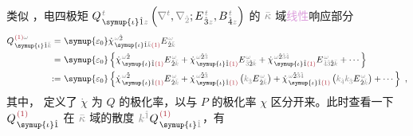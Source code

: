 类似 ，电四极矩 $Q^{\;\!\mathcolor{gray}{t}}_{\;\! \symup{\iota} \hat{1} \mathcolor{gray}{z}} \left( \mathcolor{gray}{\nabla^t}, \mathcolor{gray}{\nabla_{\hat{2}}} ; E^{\;\!\mathcolor{gray}{t}}_{\;\! \hat{3}\mathcolor{gray}{z}}, B^{\;\!\mathcolor{gray}{t}}_{\;\! \hat{4}\mathcolor{gray}{z}} \right)$ 的 $\mathcolor{gray}{\bar{\kappa}}$ 域\textcolor{Plum}{线性}响应部分
\begin{subequations}
\begin{align}
	Q^{\;\! \textcolor{Maroon}{(1)} \mathcolor{gray}{\omega}}_{\;\! \symup{\iota} \hat{1} \mathcolor{gray}{\bar{k}}} =&~ {\symup{\varepsilon_0}} \dot{\chi}^{\;\! \mathcolor{gray}{\omega} \hat{2}}_{\;\! \symup{\iota} \hat{1} \mathcolor{gray}{\bar{k}} \textcolor{Maroon}{(1)}} E^{\;\!\mathcolor{gray}{\omega}}_{\;\! \hat{2} \mathcolor{gray}{\bar{k}}} \\ =&~ {\symup{\varepsilon_0}} \left\{ \dot{\chi}^{\;\! \mathcolor{gray}{\omega} \hat{2}}_{\;\! \symup{\iota} \hat{1} \textcolor{Maroon}{(1)}} E^{\;\!\mathcolor{gray}{\omega}}_{\;\! \hat{2} \mathcolor{gray}{\bar{k}}} + \dot{\chi}^{\;\! \mathcolor{gray}{\omega} \hat{2} \mathcolor{gray}{\hat{3}}}_{\;\! \symup{\iota} \hat{1} \textcolor{Maroon}{(1)}} E^{\;\!\mathcolor{gray}{\omega}}_{\;\! \mathcolor{gray}{\hat{3}} \hat{2} \mathcolor{gray}{\bar{k}}} + \dot{\chi}^{\;\! \mathcolor{gray}{\omega} \hat{2} \mathcolor{gray}{\hat{3} \hat{4}}}_{\;\! \symup{\iota} \hat{1} \textcolor{Maroon}{(1)}} E^{\;\!\mathcolor{gray}{\omega}}_{\;\! \mathcolor{gray}{\hat{4} \hat{3}} \hat{2} \mathcolor{gray}{\bar{k}}} + \cdots \right\}  \label{eq:Q(1)_wk} \\ :=&~ {\symup{\varepsilon_0}} \left\{ \dot{\chi}^{\;\! \mathcolor{gray}{\omega} \hat{2}}_{\;\! \symup{\iota} \hat{1} \textcolor{Maroon}{(1)}} E^{\;\!\mathcolor{gray}{\omega}}_{\;\! \hat{2} \mathcolor{gray}{\bar{k}}} + \dot{\chi}^{\;\! \mathcolor{gray}{\omega} \hat{2} \mathcolor{gray}{\hat{3}}}_{\;\! \symup{\iota} \hat{1} \textcolor{Maroon}{(1)}} \left( \mathcolor{gray}{k_{\hat{3}}} E^{\;\!\mathcolor{gray}{\omega}}_{\;\! \hat{2} \mathcolor{gray}{\bar{k}}} \right) + \dot{\chi}^{\;\! \mathcolor{gray}{\omega} \hat{2} \mathcolor{gray}{\hat{3} \hat{4}}}_{\;\! \symup{\iota} \hat{1} \textcolor{Maroon}{(1)}} \left( \mathcolor{gray}{k_{\hat{4}} k_{\hat{3}}} E^{\;\!\mathcolor{gray}{\omega}}_{\;\! \hat{2} \mathcolor{gray}{\bar{k}}} \right) + \cdots \right\}~,
\end{align}
\end{subequations}
其中， 定义了 $\dot{\chi}$ 为 $Q$ 的极化率，以与 $P$ 的极化率 $\chi$ 区分开来。此时查看一下 $Q^{\;\! \textcolor{Maroon}{(1)}}_{\;\! \symup{\iota} \hat{1}}$ 在 $\mathcolor{gray}{\bar{\kappa}}$ 域的散度 $\mathcolor{gray}{k^{\hat{1}}} Q^{\;\! \textcolor{Maroon}{(1)}}_{\;\! \symup{\iota} \mathcolor{gray}{\hat{1}}}$，有
